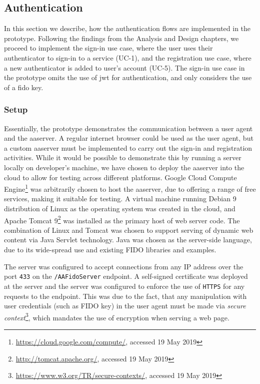 \subsection{Authentication}\label{sec:implementation-authentication}
In this section we describe, how the authentication flows are implemented in the prototype. Following the findings from the Analysis and Design chapters, we proceed to implement the sign-in use case, where the user uses their authenticator to sign-in to a service (UC-1), and the registration use case, where a new authenticator is added to user's account (UC-5). The sign-in use case in the prototype omits the use of \acrshort{jwt} for authentication, and only considers the use of a \acrshort{fido} key.

\subsubsection{Setup}
Essentially, the prototype demonstrates the communication between a user agent and the \acrshort{aaserver}. A regular internet browser could be used as the user agent, but a custom \acrshort{aaserver} must be implemented to carry out the sign-in and registration activities. While it would be possible to demonstrate this by running a server locally on developer's machine, we have chosen to deploy the \acrshort{aaserver} into the cloud to allow for testing across different platforms. Google Cloud Compute Engine\footnote{\url{https://cloud.google.com/compute/}, accessed 19 May 2019} was arbitrarily chosen to host the \acrshort{aaserver}, due to offering a range of free services, making it suitable for testing. A virtual machine running Debian 9 distribution of Linux as the operating system was created in the cloud, and Apache Tomcat 9\footnote{\url{http://tomcat.apache.org/}, accessed 19 May 2019} was installed as the primary host of web server code. The combination of Linux and Tomcat was chosen to support serving of dynamic web content via Java Servlet technology. Java was chosen as the server-side language, due to its wide-spread use and existing FIDO libraries and examples.

The server was configured to accept connections from any IP address over the port \texttt{433} on the \texttt{/AAFidoServer} endpoint. A self-signed certificate was deployed at the server and the server was configured to enforce the use of \texttt{HTTPS} for any requests to the endpoint. This was due to the fact, that any manipulation with user credentials (such as FIDO key) in the user agent must be made via \textit{secure context}\footnote{\url{https://www.w3.org/TR/secure-contexts/}, accessed 19 May 2019}, which mandates the use of encryption when serving a web page.

